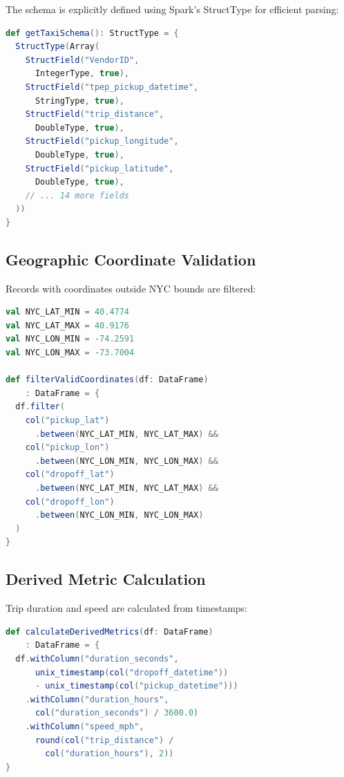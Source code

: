\documentclass[conference]{IEEEtran}
\begin{document}
The schema is explicitly defined using Spark's StructType for efficient parsing:

\begin{lstlisting}[caption={Schema Definition},language=Scala]
def getTaxiSchema(): StructType = {
  StructType(Array(
    StructField("VendorID", 
      IntegerType, true),
    StructField("tpep_pickup_datetime", 
      StringType, true),
    StructField("trip_distance", 
      DoubleType, true),
    StructField("pickup_longitude", 
      DoubleType, true),
    StructField("pickup_latitude", 
      DoubleType, true),
    // ... 14 more fields
  ))
}
\end{lstlisting}

\subsection{Geographic Coordinate Validation}

Records with coordinates outside NYC bounds are filtered:

\begin{lstlisting}[caption={Coordinate Filtering},language=Scala]
val NYC_LAT_MIN = 40.4774
val NYC_LAT_MAX = 40.9176
val NYC_LON_MIN = -74.2591
val NYC_LON_MAX = -73.7004

def filterValidCoordinates(df: DataFrame)
    : DataFrame = {
  df.filter(
    col("pickup_lat")
      .between(NYC_LAT_MIN, NYC_LAT_MAX) &&
    col("pickup_lon")
      .between(NYC_LON_MIN, NYC_LON_MAX) &&
    col("dropoff_lat")
      .between(NYC_LAT_MIN, NYC_LAT_MAX) &&
    col("dropoff_lon")
      .between(NYC_LON_MIN, NYC_LON_MAX)
  )
}
\end{lstlisting}

\subsection{Derived Metric Calculation}

Trip duration and speed are calculated from timestamps:

\begin{lstlisting}[caption={Speed Calculation},language=Scala]
def calculateDerivedMetrics(df: DataFrame)
    : DataFrame = {
  df.withColumn("duration_seconds",
      unix_timestamp(col("dropoff_datetime")) 
      - unix_timestamp(col("pickup_datetime")))
    .withColumn("duration_hours", 
      col("duration_seconds") / 3600.0)
    .withColumn("speed_mph", 
      round(col("trip_distance") / 
        col("duration_hours"), 2))
}
\end{lstlisting}
\end{document}
